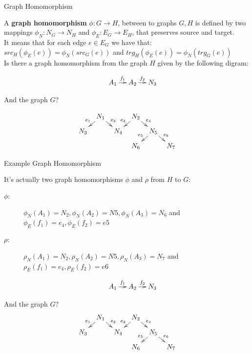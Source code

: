 \documentclass[slidetop,mathserif,red]{beamer}
\begin{document}
\begin{frame}{Graph Homomorphism}

A \textbf{graph homomorphism} $\phi: G \to H$, between to graphs $G,H$ is defined by two mappings $\phi_N : N_G \to N_H$ and $\phi_E : E_G \to E_H$, that preserves source and target.\\
It means that for each edge $e \in E_G$ we have that: $src_H(\phi_E(e)) = \phi_N(src_G(e))$ and  $trg_H(\phi_E(e)) = \phi_N(trg_G(e))$\\


Is there a graph homomorphism from the graph $H$ given by the following digram:

     \[\xymatrixrowsep{0.15in}
		\xymatrixcolsep{0.15in}
		\xymatrix{		& A_1 \ar[r]^{f_1} 	& A_2 \ar[r]	^{f_2} & N_3 } \]
		
And the graph $G$?		
		
      \[\xymatrixrowsep{0.1in}
		\xymatrixcolsep{0.1in}
      \xymatrix{		& N_1 \ar[dl]_{e_1} \ar[dr]	^{e_2}	&& N_2 \ar[dl]_{e_3} \ar[dr]^{e_4}\\
      					N_3		&&  N_4	& 						& N_5 \ar[dl]_{e_5} \ar[dr]^{e_6}\\
      																&&& N_6			&&  N_7} \]
\end{frame}


\begin{frame}{Example Graph Homomorphism}

It's actually two graph homomorphisms $\phi$ and $\rho$ from $H$ to $G$:
\begin{description}
\item[$\phi$:] 
$\phi_N(A_1) = N_2, \phi_N(A_2) = N5, \phi_N(A_3) =N_6$ and\\
$\phi_E(f_1) = e_4, \phi_E(f_2) = e5$
\item[$\rho$:]
$\rho_N(A_1) = N_2, \rho_N(A_2) = N5, \rho_N(A_3) =N_7$ and\\
$\rho_E(f_1) = e_4, \rho_E(f_2) = e6$
\end{description}

     \[\xymatrixrowsep{0.15in}
		\xymatrixcolsep{0.15in}
		\xymatrix{		& A_1 \ar[r]^{f_1} 	& A_2 \ar[r]	^{f_2} & N_3 } \]
		
And the graph $G$?		
		\[\xymatrixrowsep{0.1in}
		\xymatrixcolsep{0.1in}
      \xymatrix{		& N_1 \ar[dl]_{e_1} \ar[dr]	^{e_2}	&& N_2 \ar[dl]_{e_3} \ar[dr]^{e_4}\\
      					N_3		&&  N_4	& 						& N_5 \ar[dl]_{e_5} \ar[dr]^{e_6}\\
      																&&& N_6			&&  N_7} \]
\end{frame}
\end{document}
